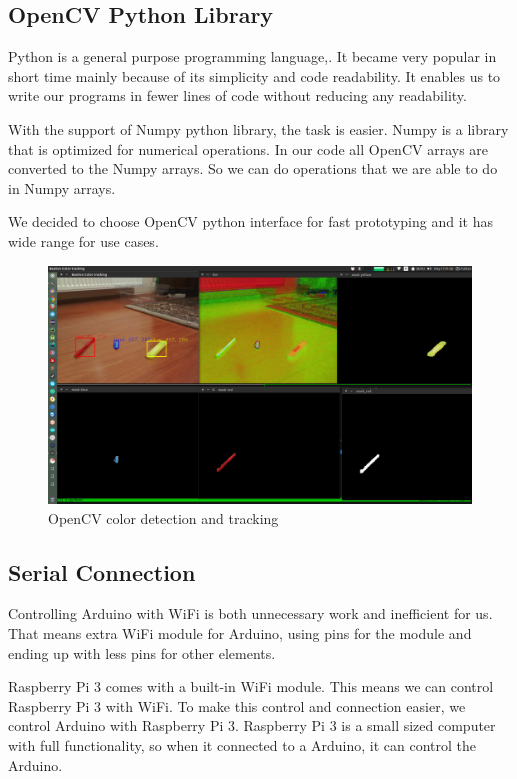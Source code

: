 \documentclass[12pt,a4paper]{article}
\begin{document}
\subsection{OpenCV Python Library}
Python is a general purpose programming language,. It became very popular in short time mainly because of its simplicity and code readability. 
It enables us to write our programs in fewer lines of code without reducing any readability.

With the support of Numpy python library, the task is easier. Numpy is a library that is optimized for numerical operations. In our code all 
OpenCV arrays are converted to the Numpy arrays. So we can do operations that we are able to do in Numpy arrays.

We decided to choose OpenCV python interface for fast prototyping and it has wide range for use cases. 
\begin{figure}[h!]
  \begin{center}
    \includegraphics[scale=0.2]{opencv_python}
    \caption{OpenCV color detection and tracking}
  \end{center}
\end{figure}

\subsection{Serial Connection}
Controlling Arduino with WiFi is both unnecessary work and inefficient for us. That means extra WiFi module for Arduino, 
using pins for the module and ending up with less pins for other elements.

Raspberry Pi 3 comes with a built-in WiFi module. This means we can control Raspberry Pi 3 with WiFi. To make this control 
and connection easier, we control Arduino with Raspberry Pi 3. Raspberry Pi 3 is a small sized computer with full functionality, 
so when it connected to a Arduino, it can control the Arduino.
\end{document}
